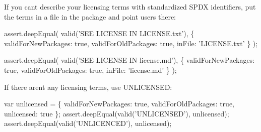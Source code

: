 If you can\textquotesingle{}t describe your licensing terms with standardized S\+P\+DX identifiers, put the terms in a file in the package and point users there\+:


\begin{DoxyCode}
assert.deepEqual(
  valid('SEE LICENSE IN LICENSE.txt'),
  \{
    validForNewPackages: true,
    validForOldPackages: true,
    inFile: 'LICENSE.txt'
  \}
);

assert.deepEqual(
  valid('SEE LICENSE IN license.md'),
  \{
    validForNewPackages: true,
    validForOldPackages: true,
    inFile: 'license.md'
  \}
);
\end{DoxyCode}


If there aren\textquotesingle{}t any licensing terms, use {\ttfamily U\+N\+L\+I\+C\+E\+N\+S\+ED}\+:


\begin{DoxyCode}
var unlicensed = \{
  validForNewPackages: true,
  validForOldPackages: true,
  unlicensed: true
\};
assert.deepEqual(valid('UNLICENSED'), unlicensed);
assert.deepEqual(valid('UNLICENCED'), unlicensed);
\end{DoxyCode}
 